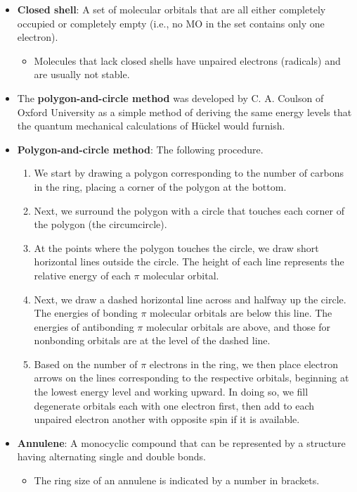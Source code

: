 \documentclass[../notes.tex]{subfiles}
\begin{document}
\begin{itemize}
    \item \textbf{Closed shell}: A set of molecular orbitals that are all either completely occupied or completely empty (i.e., no MO in the set contains only one electron).
    \begin{itemize}
        \item Molecules that lack closed shells have unpaired electrons (radicals) and are usually not stable.
    \end{itemize}
    \item The \textbf{polygon-and-circle method} was developed by C. A. Coulson of Oxford University as a simple method of deriving the same energy levels that the quantum mechanical calculations of H\"{u}ckel would furnish.
    \item \textbf{Polygon-and-circle method}: The following procedure.
    \begin{enumerate}
        \item We start by drawing a polygon corresponding to the number of carbons in the ring, placing a corner of the polygon at the bottom.
        \item Next, we surround the polygon with a circle that touches each corner of the polygon (the circumcircle).
        \item At the points where the polygon touches the circle, we draw short horizontal lines outside the circle. The height of each line represents the relative energy of each $\pi$ molecular orbital.
        \item Next, we draw a dashed horizontal line across and halfway up the circle. The energies of bonding $\pi$ molecular orbitals are below this line. The energies of antibonding $\pi$ molecular orbitals are above, and those for nonbonding orbitals are at the level of the dashed line.
        \item Based on the number of $\pi$ electrons in the ring, we then place electron arrows on the lines corresponding to the respective orbitals, beginning at the lowest energy level and working upward. In doing so, we fill degenerate orbitals each with one electron first, then add to each unpaired electron another with opposite spin if it is available.
    \end{enumerate}
    \item \textbf{Annulene}: A monocyclic compound that can be represented by a structure having alternating single and double bonds.
    \begin{itemize}
        \item The ring size of an annulene is indicated by a number in brackets.

\end{itemize}
\end{itemize}
\end{document}
